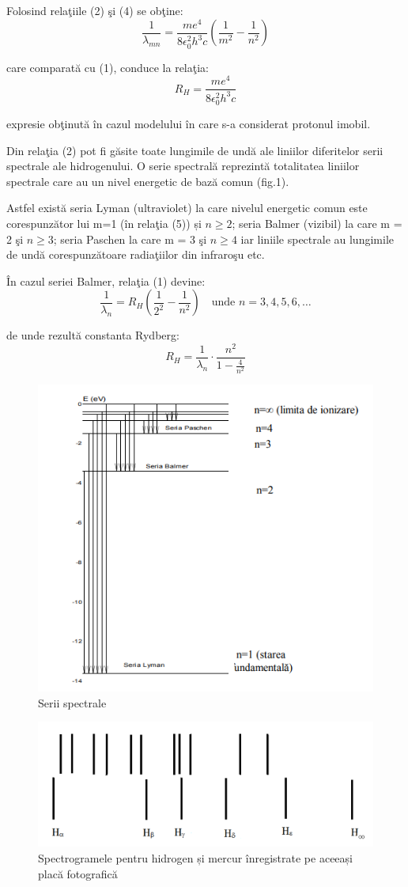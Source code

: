 \documentclass{article}
\begin{document}
Folosind relaţiile (2) şi (4) se obţine:
\begin{equation}
	\frac{1}{\lambda_{mn}} = \frac{me^4}{8\epsilon_0^2h^3c}\left(\frac{1}{m^2} - \frac{1}{n^2}\right)
\end{equation}

care comparată cu (1), conduce la relaţia:
\begin{equation}
	R_H = \frac{me^4}{8\epsilon_0^2h^3c}
\end{equation}

expresie obţinută în cazul modelului în care s-a considerat protonul imobil.

Din relaţia (2) pot fi găsite toate lungimile de undă ale liniilor diferitelor serii spectrale
ale hidrogenului. O serie spectrală reprezintă totalitatea liniilor spectrale care au un nivel
energetic de bază comun (fig.1).

Astfel există seria Lyman (ultraviolet) la care nivelul energetic comun este
corespunzător lui m=1 (în relaţia (5)) și $n \geq 2$; seria Balmer (vizibil) la care m = 2 şi $n \geq 3$;
seria Paschen la care m = 3 şi $n \geq 4$ iar liniile spectrale au lungimile de undă corespunzătoare
radiaţiilor din infraroşu etc.

În cazul seriei Balmer, relaţia (1) devine:
\begin{equation}
	\frac{1}{\lambda_n} = R_H\left(\frac{1}{2^2} - \frac{1}{n^2}\right) \quad \text{unde } n=3,4,5,6,\ldots
\end{equation}

de unde rezultă constanta Rydberg:
\begin{equation}
	R_H = \frac{1}{\lambda_n}\cdot\frac{n^2}{1-\frac{4}{n^2}}
\end{equation}

\begin{figure}
	\includegraphics[width=0.5\linewidth]{serii-spectrale.png}
	\caption{Serii spectrale}
\end{figure}
\begin{figure}
	\includegraphics[width=0.5\linewidth]{spectrograme.png}
	\caption{Spectrogramele pentru hidrogen și mercur înregistrate pe aceeași
		placă fotografică}
\end{figure}
\end{document}
